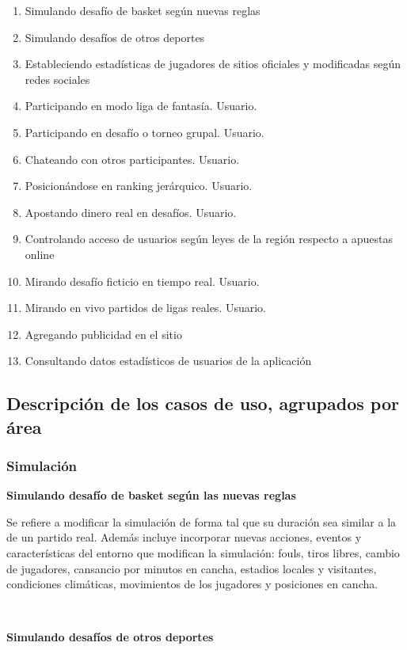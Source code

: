 \begin{enumerate}
  \item Simulando desafío de basket según nuevas reglas
  \item Simulando desafíos de otros deportes
  \item Estableciendo estadísticas de jugadores de sitios oficiales y modificadas según redes sociales
  \item Participando en modo liga de fantasía. Usuario. 
  \item Participando en desafío o torneo grupal. Usuario.
  \item Chateando con otros participantes. Usuario.
  \item Posicionándose en ranking jerárquico. Usuario.
  \item Apostando dinero real en desafíos. Usuario.
  \item Controlando acceso de usuarios según leyes de la región respecto a apuestas online
  \item Mirando desafío ficticio en tiempo real. Usuario.
  \item Mirando en vivo partidos de ligas reales. Usuario.
  \item Agregando publicidad en el sitio
  \item Consultando datos estadísticos de usuarios de la aplicación
\end{enumerate}

\subsection{Descripción de los casos de uso, agrupados por área}

\subsubsection{Simulación}

\textbf{Simulando desafío de basket según las nuevas reglas}

Se refiere a modificar la simulación de forma tal que su duración sea similar a la de un partido real. Además incluye incorporar 
nuevas acciones, eventos y características del entorno que modifican la simulación: fouls, tiros libres, cambio de jugadores, cansancio
por minutos en cancha, estadios locales y visitantes, condiciones climáticas, movimientos de los jugadores y posiciones en cancha.

~

\textbf{Simulando desafíos de otros deportes}

